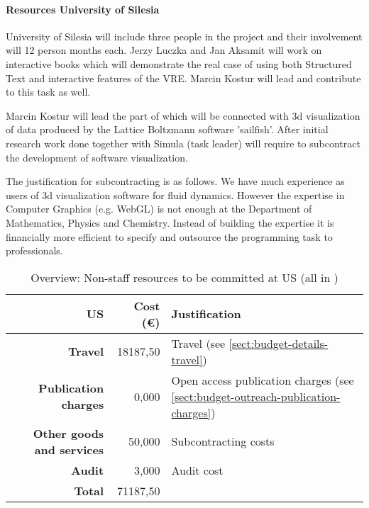 \paragraph{Resources University of Silesia}

University of Silesia will include three people in the project and
their involvement will 12 person months each. Jerzy Luczka and Jan Aksamit will
work on interactive books  which will
demonstrate the real case of using both Structured Text and
interactive features of the VRE. Marcin Kostur will lead and
contribute to this task as well.

Marcin Kostur will lead the part of  which will
be connected with 3d visualization of data produced by the Lattice
Boltzmann software 'sailfish'. After initial research work done
together with Simula (task leader) will require to subcontract the
development of software visualization.

The justification for subcontracting is as follows. We have much
experience as users of 3d visualization software for fluid
dynamics. However the expertise in Computer Graphics (e.g. WebGL) is
not enough at the Department of Mathematics, Physics and
Chemistry. Instead of building the expertise it is financially more
efficient to specify and outsource the programming task to professionals.


\bigskip
\begin{table}[H]
\begin{tabular}{|r|r|p{8.5cm}|}
\hline
\textbf{US} & \textbf{Cost (\euro)} & \textbf{Justification} \\\hline
\textbf{Travel} & 18187,50 & Travel (see \ref{sect:budget-details-travel})\\\hline
\textbf{Publication charges} & 0,000 & Open access publication charges (see \ref{sect:budget-outreach-publication-charges})\\\hline
\textbf{Other goods and services} & 50,000 & Subcontracting costs  \\\hline   %
\textbf{Audit} & 3,000 & Audit cost \\\hline
\textbf{Total} & 71187,50\\\cline{1-2}
\end{tabular}
\caption{Overview: Non-staff resources to be committed at US (all in \texteuro)}\vspace*{-1em}
\end{table}




